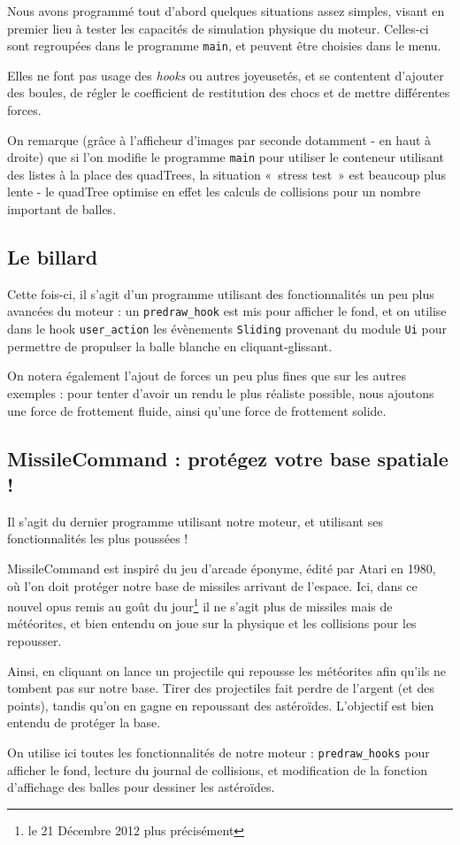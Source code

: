 \documentclass[a4paper]{scrartcl}
\begin{document}
Nous avons programmé tout d'abord quelques situations assez simples,
visant en premier lieu à tester les capacités de simulation physique
du moteur. Celles-ci sont regroupées dans le programme \texttt{main},
et peuvent être choisies dans le menu.

Elles ne font pas usage des \emph{hooks} ou autres joyeusetés, et se
contentent d'ajouter des boules, de régler le coefficient de
restitution des chocs et de mettre différentes forces.

On remarque (grâce à l'afficheur d'images par seconde dotamment - en
haut à droite) que si l'on modifie le programme \texttt{main} pour
utiliser le conteneur utilisant des listes à la place des quadTrees,
la situation «~stress test~» est beaucoup plus lente - le quadTree
optimise en effet les calculs de collisions pour un nombre important
de balles.

\subsection{Le billard}

Cette fois-ci, il s'agit d'un programme utilisant des fonctionnalités
un peu plus avancées du moteur : un \texttt{predraw\_hook} est mis
pour afficher le fond, et on utilise dans le hook
\texttt{user\_action} les évènements \texttt{Sliding} provenant du
module \texttt{Ui} pour permettre de propulser la balle blanche en
cliquant-glissant.

On notera également l'ajout de forces un peu plus fines que sur les
autres exemples : pour tenter d'avoir un rendu le plus réaliste
possible, nous ajoutons une force de frottement fluide, ainsi qu'une
force de frottement solide.

\subsection{MissileCommand : protégez votre base spatiale !}

Il s'agit du dernier programme utilisant notre moteur, et utilisant
ses fonctionnalités les plus poussées !

MissileCommand est inspiré du jeu d'arcade éponyme, édité par Atari en
1980, où l'on doit protéger notre base de missiles arrivant de
l'espace. Ici, dans ce nouvel opus remis au goût du jour\footnote{le
  21 Décembre 2012 plus précisément} il ne s'agit plus de missiles
mais de météorites, et bien entendu on joue sur la physique et les
collisions pour les repousser.

Ainsi, en cliquant on lance un projectile qui repousse les météorites
afin qu'ils ne tombent pas sur notre base. Tirer des projectiles fait
perdre de l'argent (et des points), tandis qu'on en gagne en
repoussant des astéroïdes. L'objectif est bien entendu de protéger la
base.

On utilise ici toutes les fonctionnalités de notre moteur :
\texttt{predraw\_hooks} pour afficher le fond, lecture du journal de
collisions, et modification de la fonction d'affichage des balles pour
dessiner les astéroïdes.
\end{document}
